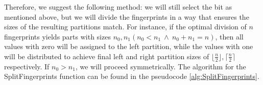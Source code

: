 Therefore, we suggest the following method: we will still select the bit as mentioned above, but we will divide the fingerprints in a way that ensures the sizes of the resulting partitions match. For instance, if the optimal division of $n$ fingerprints yields parts with sizes $n_0, n_1 (n_0 < n_1 \ \land \ n_0 + n_1 = n)$, then all values with zero will be assigned to the left partition, while the values with one will be distributed to achieve final left and right partition sizes of $\lfloor\frac{n}{2}\rfloor, \lceil \frac{n}{2} \rceil$ respectively. If $n_0 > n_1$, we will proceed symmetrically. The algorithm for the SplitFingerprints function can be found in the pseudocode \ref{alg:SplitFingerprints}.

